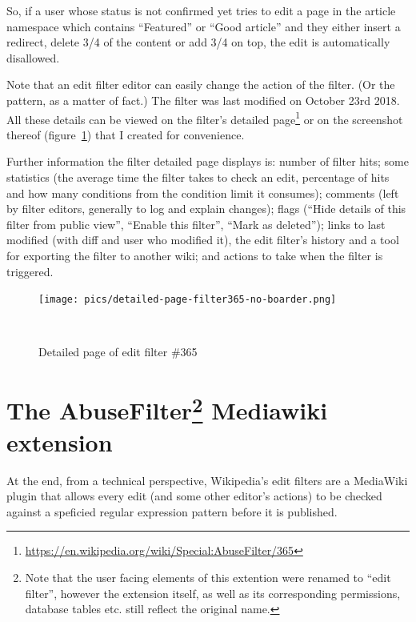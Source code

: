 So, if a user whose status is not confirmed yet tries to edit a page in the article namespace which contains ``Featured'' or ``Good article'' and they either insert a redirect, delete 3/4 of the content or add 3/4 on top, the edit is automatically disallowed.

Note that an edit filter editor can easily change the action of the filter. (Or the pattern, as a matter of fact.)
The filter was last modified on October 23rd 2018.
All these details can be viewed on the filter's detailed page\footnote{\url{https://en.wikipedia.org/wiki/Special:AbuseFilter/365}}
or on the screenshot thereof (figure~\ref{fig:filter-details}) that I created for convenience.

Further information the filter detailed page displays is:
number of filter hits;
some statistics (the average time the filter takes to check an edit, percentage of hits and how many conditions from the condition limit it consumes);%
comments (left by filter editors, generally to log and explain changes);
flags (``Hide details of this filter from public view'', ``Enable this filter'', ``Mark as deleted'');
links to last modified (with diff and user who modified it), the edit filter's history and a tool for exporting the filter to another wiki;
and actions to take when the filter is triggered.

\begin{figure}
\centering
  \texttt{[image: pics/detailed-page-filter365-no-boarder.png]}
  \caption{Detailed page of edit filter \#365}~\label{fig:filter-details}
\end{figure}


\section{The AbuseFilter\footnote{Note that the user facing elements of this extention were renamed to ``edit filter'', however the extension itself, as well as its corresponding permissions, database tables etc. still reflect the original name.} Mediawiki extension}

At the end, from a technical perspective, Wikipedia's edit filters are a MediaWiki plugin that allows every edit (and some other editor's actions) to be checked against a speficied regular expression pattern before it is published.


